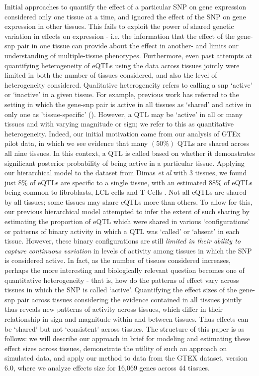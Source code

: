 Initial approaches to quantify the effect of a particular SNP on gene expression considered only one tissue at a time, and ignored the effect of the SNP on gene expression in other tissues.
This fails to exploit the power of  shared genetic variation in effects on expression - i.e. the information that the effect of the gene-snp pair in one tissue can provide about the effect in another- and limits our understanding of multiple-tissue phenotypes.
Furthermore, even past attempts at quantifying heterogeneity of eQTLs using the data across tissues jointly were limited in both the number of tissues considered, and also the level of heterogeneity considered. Qualitative heterogeneity refers to calling a snp `active' or `inactive' in a given tissue. For example, previous work has referred to the setting in which the gene-snp pair is active in all tissues as `shared' and active in only one as 'tissue-specific'  (\cite{flutre_statistical_2013,wen_bayesian_2014}).
However, a QTL may be `active' in all or many tissues and with varying magnitude or sign; we refer to this as quantitative heterogeneity.
 Indeed, our initial motivation came from our analysis of GTEx pilot data, in which we see evidence that many $(50\%)$ QTLs are shared across all nine tissues. In this context, a QTL is called based on whether it demonstrates significant posterior probability of being active in a particular tissue. Applying our hierarchical model to the dataset from Dimas {\it et al} \cite{dimas_common_2009} with 3 tissues, we found just 8\% of eQTLs are specific to a single tissue, with an estimated 88\% of eQTLs being common to fibroblasts, LCL cells and T-Cells \cite{flutre_statistical_2013}. Not all eQTLs are shared by all tissues; some tissues may share eQTLs more than others. To allow for this, our previous hierarchical model attempted to infer the extent of such sharing by estimating the proportion of eQTL which were shared in various `configurations' or patterns of binary activity in which a QTL was `called' or `absent' in each tissue.
 However, these binary configurations are still \textit{limited in their ability to capture continuous variation} in levels of activity among tissues in which the SNP is considered active. 
 In fact, as the number of tissues considered increases, perhaps the more interesting and biologically relevant question becomes one of quantitative heterogeneity - that is, how do the patterns of effect vary across tissues in which the SNP is called `active'.  
Quantifying the effect sizes of the gene-snp pair across tissues considering the evidence contained in all tissues jointly thus reveals new patterns of activity across tissues, which differ in their relationship in sign and magnitude within and between tissues. Thus effects can be `shared' but not `consistent' across tissues. The structure of this paper is as follows: we will describe our approach in brief for modeling and estimating these effect sizes across tissues, demonstrate the utility of such an approach on simulated data, and apply our method to data from the GTEX dataset, version 6.0, where we analyze effects size for 16,069 genes across 44 tissues.
